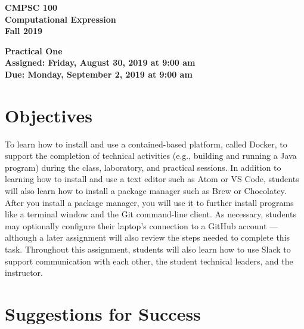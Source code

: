 \documentclass[11pt]{article}
\newcommand{\assignmentduedate}{September 2}
\newcommand{\assignmentassignedate}{August 30}
\newcommand{\assignmentnumber}{One}
\newcommand{\labyear}{2019}
\newcommand{\labdueday}{Monday}
\newcommand{\labassignday}{Friday}
\newcommand{\labtime}{9:00 am}
\newcommand{\assigneddate}{Assigned: \labassignday, \assignmentassignedate, \labyear{} at \labtime{}}
\newcommand{\duedate}{Due: \labdueday, \assignmentduedate, \labyear{} at \labtime{}}
\newcommand{\labtitle}[1]
{
  \begin{center}
    \begin{center}
      \bf
      CMPSC 100\\Computational Expression\\
      Fall 2019\\
      \medskip
    \end{center}
    \bf
    #1
  \end{center}
}
\begin{document}
\thispagestyle{empty}

\labtitle{Practical \assignmentnumber{} \\ \assigneddate{} \\ \duedate{}}



\section*{Objectives}

To learn how to install and use a contained-based platform, called Docker, to
support the completion of technical activities (e.g., building and running a
Java program) during the class, laboratory, and practical sessions. In addition
to learning how to install and use a text editor such as Atom or VS Code,
students will also learn how to install a package manager such as Brew or
Chocolatey. After you install a package manager, you will use it to further
install programs like a terminal window and the Git command-line client. As
necessary, students may optionally configure their laptop's connection to a
GitHub account --- although a later assignment will also review the steps
needed to complete this task. Throughout this assignment, students will also
learn how to use Slack to support communication with each other, the student
technical leaders, and the instructor.

\section*{Suggestions for Success}
\end{document}

